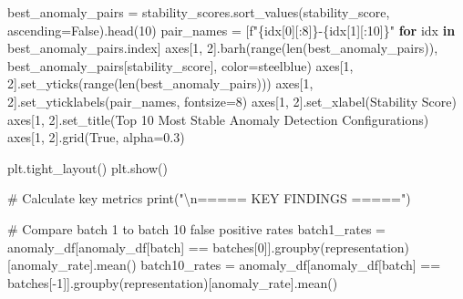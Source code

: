 \documentclass[
  letterpaper,
  DIV=11,
  numbers=noendperiod]{scrartcl}
\newenvironment{Shaded}{\begin{snugshade}}{\end{snugshade}}
\newcommand{\BuiltInTok}[1]{\textcolor[rgb]{0.00,0.23,0.31}{#1}}
\newcommand{\CharTok}[1]{\textcolor[rgb]{0.13,0.47,0.30}{#1}}
\newcommand{\CommentTok}[1]{\textcolor[rgb]{0.37,0.37,0.37}{#1}}
\newcommand{\ControlFlowTok}[1]{\textcolor[rgb]{0.00,0.23,0.31}{\textbf{#1}}}
\newcommand{\DecValTok}[1]{\textcolor[rgb]{0.68,0.00,0.00}{#1}}
\newcommand{\FloatTok}[1]{\textcolor[rgb]{0.68,0.00,0.00}{#1}}
\newcommand{\KeywordTok}[1]{\textcolor[rgb]{0.00,0.23,0.31}{\textbf{#1}}}
\newcommand{\NormalTok}[1]{\textcolor[rgb]{0.00,0.23,0.31}{#1}}
\newcommand{\OperatorTok}[1]{\textcolor[rgb]{0.37,0.37,0.37}{#1}}
\newcommand{\SpecialCharTok}[1]{\textcolor[rgb]{0.37,0.37,0.37}{#1}}
\newcommand{\SpecialStringTok}[1]{\textcolor[rgb]{0.13,0.47,0.30}{#1}}
\newcommand{\StringTok}[1]{\textcolor[rgb]{0.13,0.47,0.30}{#1}}
\newcommand{\VariableTok}[1]{\textcolor[rgb]{0.07,0.07,0.07}{#1}}
\renewenvironment{Shaded}{%
  \begin{tcolorbox}[%
    enhanced,%
    colback=codebg,%
    colframe=codebg,%
    borderline west={3pt}{0pt}{sectionblue},%
    fontupper=\small\ttfamily,%
    boxrule=0pt,%
    arc=0pt,%
    boxsep=5pt,%
    left=2mm,%
    right=2mm,%
    top=2mm,%
    bottom=2mm%
  ]%
}{%
  \end{tcolorbox}%
}
\begin{document}
\begin{Shaded}
\begin{Highlighting}[]
\NormalTok{best\_anomaly\_pairs }\OperatorTok{=}\NormalTok{ stability\_scores.sort\_values(}\StringTok{\textquotesingle{}stability\_score\textquotesingle{}}\NormalTok{, ascending}\OperatorTok{=}\VariableTok{False}\NormalTok{).head(}\DecValTok{10}\NormalTok{)}
\NormalTok{pair\_names }\OperatorTok{=}\NormalTok{ [}\SpecialStringTok{f"}\SpecialCharTok{\{}\NormalTok{idx[}\DecValTok{0}\NormalTok{][:}\DecValTok{8}\NormalTok{]}\SpecialCharTok{\}}\SpecialStringTok{{-}}\SpecialCharTok{\{}\NormalTok{idx[}\DecValTok{1}\NormalTok{][:}\DecValTok{10}\NormalTok{]}\SpecialCharTok{\}}\SpecialStringTok{"} \ControlFlowTok{for}\NormalTok{ idx }\KeywordTok{in}\NormalTok{ best\_anomaly\_pairs.index]}
\NormalTok{axes[}\DecValTok{1}\NormalTok{, }\DecValTok{2}\NormalTok{].barh(}\BuiltInTok{range}\NormalTok{(}\BuiltInTok{len}\NormalTok{(best\_anomaly\_pairs)), best\_anomaly\_pairs[}\StringTok{\textquotesingle{}stability\_score\textquotesingle{}}\NormalTok{], }
\NormalTok{               color}\OperatorTok{=}\StringTok{\textquotesingle{}steelblue\textquotesingle{}}\NormalTok{)}
\NormalTok{axes[}\DecValTok{1}\NormalTok{, }\DecValTok{2}\NormalTok{].set\_yticks(}\BuiltInTok{range}\NormalTok{(}\BuiltInTok{len}\NormalTok{(best\_anomaly\_pairs)))}
\NormalTok{axes[}\DecValTok{1}\NormalTok{, }\DecValTok{2}\NormalTok{].set\_yticklabels(pair\_names, fontsize}\OperatorTok{=}\DecValTok{8}\NormalTok{)}
\NormalTok{axes[}\DecValTok{1}\NormalTok{, }\DecValTok{2}\NormalTok{].set\_xlabel(}\StringTok{\textquotesingle{}Stability Score\textquotesingle{}}\NormalTok{)}
\NormalTok{axes[}\DecValTok{1}\NormalTok{, }\DecValTok{2}\NormalTok{].set\_title(}\StringTok{\textquotesingle{}Top 10 Most Stable Anomaly Detection Configurations\textquotesingle{}}\NormalTok{)}
\NormalTok{axes[}\DecValTok{1}\NormalTok{, }\DecValTok{2}\NormalTok{].grid(}\VariableTok{True}\NormalTok{, alpha}\OperatorTok{=}\FloatTok{0.3}\NormalTok{)}

\NormalTok{plt.tight\_layout()}
\NormalTok{plt.show()}

\CommentTok{\# Calculate key metrics}
\BuiltInTok{print}\NormalTok{(}\StringTok{"}\CharTok{\textbackslash{}n}\StringTok{===== KEY FINDINGS ====="}\NormalTok{)}

\CommentTok{\# Compare batch 1 to batch 10 false positive rates}
\NormalTok{batch1\_rates }\OperatorTok{=}\NormalTok{ anomaly\_df[anomaly\_df[}\StringTok{\textquotesingle{}batch\textquotesingle{}}\NormalTok{] }\OperatorTok{==}\NormalTok{ batches[}\DecValTok{0}\NormalTok{]].groupby(}\StringTok{\textquotesingle{}representation\textquotesingle{}}\NormalTok{)[}\StringTok{\textquotesingle{}anomaly\_rate\textquotesingle{}}\NormalTok{].mean()}
\NormalTok{batch10\_rates }\OperatorTok{=}\NormalTok{ anomaly\_df[anomaly\_df[}\StringTok{\textquotesingle{}batch\textquotesingle{}}\NormalTok{] }\OperatorTok{==}\NormalTok{ batches[}\OperatorTok{{-}}\DecValTok{1}\NormalTok{]].groupby(}\StringTok{\textquotesingle{}representation\textquotesingle{}}\NormalTok{)[}\StringTok{\textquotesingle{}anomaly\_rate\textquotesingle{}}\NormalTok{].mean()}


\end{Highlighting}
\end{Shaded}
\end{document}
